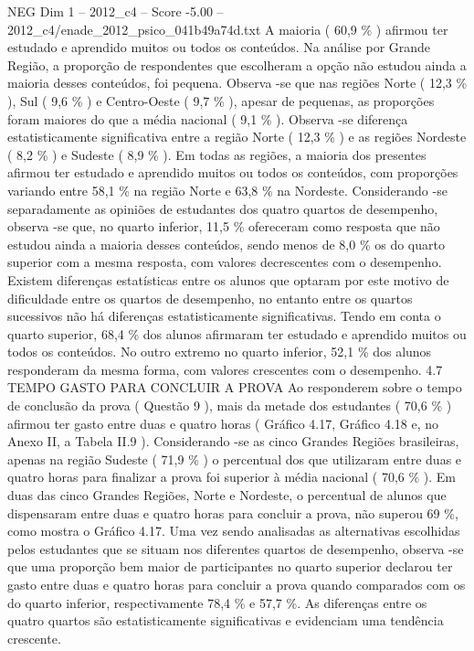 \begin{textsample}{NEG Dim 1 – 2012\_c4 – Score -5.00 – 2012\_c4/enade\_2012\_psico\_041b49a74d.txt}
A maioria ( 60,9 \% ) afirmou ter estudado e aprendido muitos ou todos os conteúdos.
Na análise por Grande Região, a proporção de respondentes que escolheram a opção não estudou ainda a maioria desses conteúdos, foi pequena.
Observa -se que nas regiões Norte ( 12,3 \% ), Sul ( 9,6 \% ) e Centro-Oeste ( 9,7 \% ), apesar de pequenas, as proporções foram maiores do que a média nacional ( 9,1 \% ).
Observa -se diferença estatisticamente significativa entre a região Norte ( 12,3 \% ) e as regiões Nordeste ( 8,2 \% ) e Sudeste ( 8,9 \% ).
Em todas as regiões, a maioria dos presentes afirmou ter estudado e aprendido muitos ou todos os conteúdos, com proporções variando entre 58,1 \% na região Norte e 63,8 \% na Nordeste.
Considerando -se separadamente as opiniões de estudantes dos quatro quartos de desempenho, observa -se que, no quarto inferior, 11,5 \% ofereceram como resposta que não estudou ainda a maioria desses conteúdos, sendo menos de 8,0 \% os do quarto superior com a mesma resposta, com valores decrescentes com o desempenho.
Existem diferenças estatísticas entre os alunos que optaram por este motivo de dificuldade entre os quartos de desempenho, no entanto entre os quartos sucessivos não há diferenças estatisticamente significativas.
Tendo em conta o quarto superior, 68,4 \% dos alunos afirmaram ter estudado e aprendido muitos ou todos os conteúdos.
No outro extremo no quarto inferior, 52,1 \% dos alunos responderam da mesma forma, com valores crescentes com o desempenho. 4.7 TEMPO GASTO PARA CONCLUIR A PROVA Ao responderem sobre o tempo de conclusão da prova ( Questão 9 ), mais da metade dos estudantes ( 70,6 \% ) afirmou ter gasto entre duas e quatro horas ( Gráfico 4.17, Gráfico 4.18 e, no Anexo II, a Tabela II.9 ).
Considerando -se as cinco Grandes Regiões brasileiras, apenas na região Sudeste ( 71,9 \% ) o percentual dos que utilizaram entre duas e quatro horas para finalizar a prova foi superior à média nacional ( 70,6 \% ).
Em duas das cinco Grandes Regiões, Norte e Nordeste, o percentual de alunos que dispensaram entre duas e quatro horas para concluir a prova, não superou 69 \%, como mostra o Gráfico 4.17.
Uma vez sendo analisadas as alternativas escolhidas pelos estudantes que se situam nos diferentes quartos de desempenho, observa -se que uma proporção bem maior de participantes no quarto superior declarou ter gasto entre duas e quatro horas para concluir a prova quando comparados com os do quarto inferior, respectivamente 78,4 \% e 57,7 \%.
As diferenças entre os quatro quartos são estatisticamente significativas e evidenciam uma tendência crescente.

\end{textsample}
